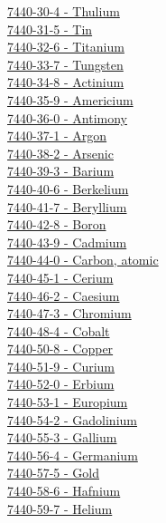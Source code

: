 \begin{multicols}{2}
\hyperref[sec:elem-thulium]{7440-30-4 - Thulium}\\
\hyperref[sec:elem-tin]{7440-31-5 - Tin}\\
\hyperref[sec:elem-titanium]{7440-32-6 - Titanium}\\
\hyperref[sec:elem-tungsten]{7440-33-7 - Tungsten}\\
\hyperref[sec:elem-actinium]{7440-34-8 - Actinium}\\
\hyperref[sec:elem-americium]{7440-35-9 - Americium}\\
\hyperref[sec:elem-antimony]{7440-36-0 - Antimony}\\
\hyperref[sec:elem-argon]{7440-37-1 - Argon}\\
\hyperref[sec:elem-arsenic]{7440-38-2 - Arsenic}\\
\hyperref[sec:elem-barium]{7440-39-3 - Barium}\\
\hyperref[sec:elem-berkelium]{7440-40-6 - Berkelium}\\
\hyperref[sec:elem-beryllium]{7440-41-7 - Beryllium}\\
\hyperref[sec:elem-boron]{7440-42-8 - Boron}\\
\hyperref[sec:elem-cadmium]{7440-43-9 - Cadmium}\\
\hyperref[sec:elem-carbon]{7440-44-0 - Carbon, atomic}\\
\hyperref[sec:elem-cerium]{7440-45-1 - Cerium}\\
\hyperref[sec:elem-caesium]{7440-46-2 - Caesium}\\
\hyperref[sec:elem-chromium]{7440-47-3 - Chromium}\\
\hyperref[sec:elem-cobalt]{7440-48-4 - Cobalt}\\
\hyperref[sec:elem-copper]{7440-50-8 - Copper}\\
\hyperref[sec:elem-curium]{7440-51-9 - Curium}\\
\hyperref[sec:elem-erbium]{7440-52-0 - Erbium}\\
\hyperref[sec:elem-europium]{7440-53-1 - Europium}\\
\hyperref[sec:elem-gadolinium]{7440-54-2 - Gadolinium}\\
\hyperref[sec:elem-gallium]{7440-55-3 - Gallium}\\
\hyperref[sec:elem-germanium]{7440-56-4 - Germanium}\\
\hyperref[sec:elem-gold]{7440-57-5 - Gold}\\
\hyperref[sec:elem-hafnium]{7440-58-6 - Hafnium}\\
\hyperref[sec:elem-helium]{7440-59-7 - Helium}\\

\end{multicols}
